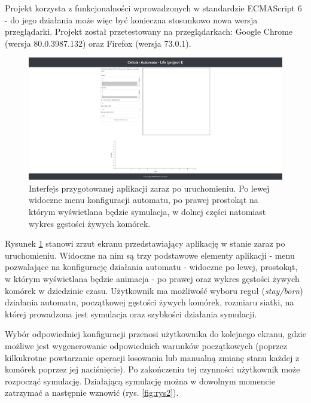 \documentclass[12pt] {article}
\begin{document}
Projekt korzysta z funkcjonalności wprowadzonych w standardzie ECMAScript 6 - do jego działania może więc być konieczna stosunkowo nowa wersja przeglądarki. Projekt został przetestowany na przeglądarkach: Google Chrome (wersja 80.0.3987.132) oraz Firefox (wersja 73.0.1). 

\begin{figure}[H]
\centering
\includegraphics[width=\textwidth]{res/interface1.png}
\caption{Interfejs przygotowanej aplikacji zaraz po uruchomieniu. Po lewej widoczne menu konfiguracji automatu, po prawej prostokąt na którym wyświetlana będzie symulacja, w dolnej części natomiast wykres gęstości żywych komórek.}
\label{fig:rys1}
\end{figure} 
\newpage

Rysunek \ref{fig:rys1} stanowi zrzut ekranu przedstawiający aplikację w stanie zaraz po uruchomieniu. Widoczne na nim są trzy podstawowe elementy aplikacji - menu pozwalające na konfigurację działania automatu - widoczne po lewej, prostokąt, w którym wyświetlana będzie animacja - po prawej oraz wykres gęstości żywych komórek w dziedzinie czasu. Użytkownik ma możliwość wyboru reguł (\textit{stay/born}) działania automatu, początkowej gęstości żywych komórek, rozmiaru siatki, na której prowadzona jest symulacja oraz szybkości działania symulacji. 


Wybór odpowiedniej konfiguracji przenosi użytkownika do kolejnego ekranu, gdzie możliwe jest wygenerowanie odpowiednich warunków początkowych (poprzez kilkukrotne powtarzanie operacji losowania lub manualną zmianę stanu każdej z komórek poprzez jej naciśnięcie). Po zakończeniu tej czynności użytkownik może rozpocząć symulację. Działającą symulację można w dowolnym momencie zatrzymać a następnie wznowić (rys. \ref{fig:rys2}).
\end{document}
